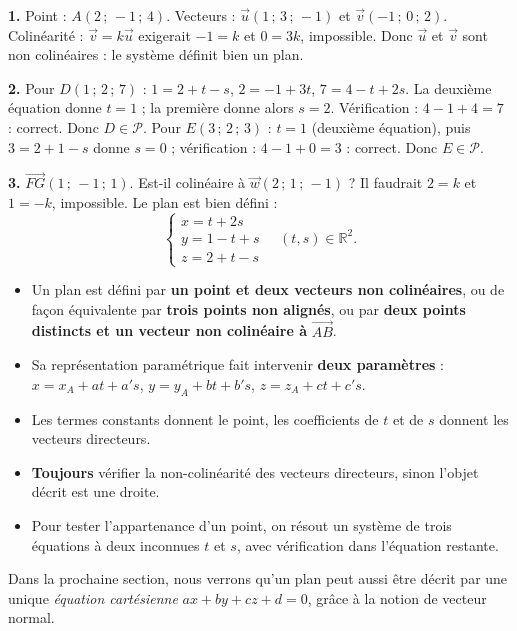\documentclass[11pt]{article}
\begin{document}
\begin{corrige}[Exercice 1]
\textbf{1.} Point : $A(2\,;\,-1\,;\,4)$. Vecteurs : $\vec{u}(1\,;\,3\,;\,-1)$ et $\vec{v}(-1\,;\,0\,;\,2)$. Colinéarité : $\vec{v} = k\vec{u}$ exigerait $-1 = k$ et $0 = 3k$, impossible. Donc $\vec{u}$ et $\vec{v}$ sont non colinéaires : le système définit bien un plan.

\textbf{2.} Pour $D(1\,;\,2\,;\,7)$ : $1 = 2 + t - s$, $2 = -1 + 3t$, $7 = 4 - t + 2s$. La deuxième équation donne $t = 1$ ; la première donne alors $s = 2$. Vérification : $4 - 1 + 4 = 7$ : correct. Donc $D \in \mathcal{P}$. Pour $E(3\,;\,2\,;\,3)$ : $t = 1$ (deuxième équation), puis $3 = 2 + 1 - s$ donne $s = 0$ ; vérification : $4 - 1 + 0 = 3$ : correct. Donc $E \in \mathcal{P}$.

\textbf{3.} $\overrightarrow{FG}(1\,;\,-1\,;\,1)$. Est-il colinéaire à $\vec{w}(2\,;\,1\,;\,-1)$ ? Il faudrait $2 = k$ et $1 = -k$, impossible. Le plan est bien défini :
\[ \begin{cases} x = t + 2s \\ y = 1 - t + s \\ z = 2 + t - s \end{cases} \quad (t,s) \in \mathbb{R}^2. \]
\end{corrige}

\begin{aretenir}
\begin{itemize}
  \item Un plan est défini par \textbf{un point et deux vecteurs non colinéaires}, ou de façon équivalente par \textbf{trois points non alignés}, ou par \textbf{deux points distincts et un vecteur non colinéaire à} $\overrightarrow{AB}$.
  \item Sa représentation paramétrique fait intervenir \textbf{deux paramètres} : $x = x_A + at + a's$, $y = y_A + bt + b's$, $z = z_A + ct + c's$.
  \item Les termes constants donnent le point, les coefficients de $t$ et de $s$ donnent les vecteurs directeurs.
  \item \textbf{Toujours} vérifier la non-colinéarité des vecteurs directeurs, sinon l'objet décrit est une droite.
  \item Pour tester l'appartenance d'un point, on résout un système de trois équations à deux inconnues $t$ et $s$, avec vérification dans l'équation restante.
\end{itemize}
Dans la prochaine section, nous verrons qu'un plan peut aussi être décrit par une unique \emph{équation cartésienne} $ax + by + cz + d = 0$, grâce à la notion de vecteur normal.
\end{aretenir}
\end{document}
